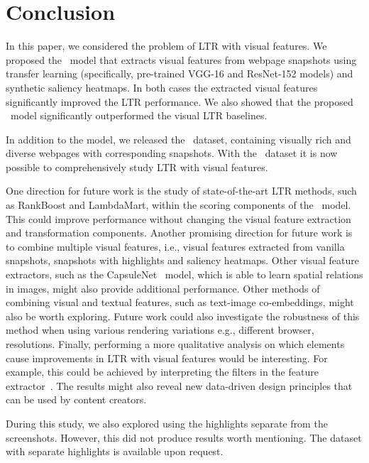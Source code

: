
\section{Conclusion}
In this paper, we considered the problem of \ac{LTR} with visual features.
We proposed the \modelname~model that extracts visual features from webpage snapshots
using transfer learning (specifically, pre-trained VGG-16 and ResNet-152 models) and synthetic saliency heatmaps.
In both cases the extracted visual features significantly improved the \ac{LTR} performance.
We also showed that the proposed \modelname~model significantly outperformed the visual \ac{LTR} baselines.

In addition to the model, we released the \datasetname~dataset, containing visually rich and diverse webpages with corresponding snapshots.
With the \datasetname~dataset it is now possible to comprehensively study \ac{LTR} with visual features.

One direction for future work is the study of state-of-the-art \ac{LTR} methods, such as RankBoost and LambdaMart, within the scoring components of the \modelname~model.
This could improve performance without changing the visual feature extraction and transformation components.
Another promising direction for future work is to combine multiple visual features,
i.e., visual features extracted from vanilla snapshots, snapshots with highlights and saliency heatmaps. Other visual feature extractors, such as the CapsuleNet~\cite{sabour2017dynamic} model, which is able to learn spatial relations in images, might also provide additional performance. Other methods of combining visual and textual features, such as text-image co-embeddings, might also be worth exploring. 
Future work could also investigate the robustness of this method when using various rendering variations e.g., different browser, resolutions. 
Finally, performing a more qualitative analysis on which elements cause improvements in \ac{LTR} with visual features would be interesting. For example, this could be achieved by interpreting the filters in the feature extractor~\cite{olah2018the}. 
The results 
might also reveal new data-driven design principles that can be used by content creators. 

During this study, we also explored using the highlights separate from the screenshots. 
However, this did not produce results worth mentioning. 
The dataset with separate highlights is available upon request. 
\fi